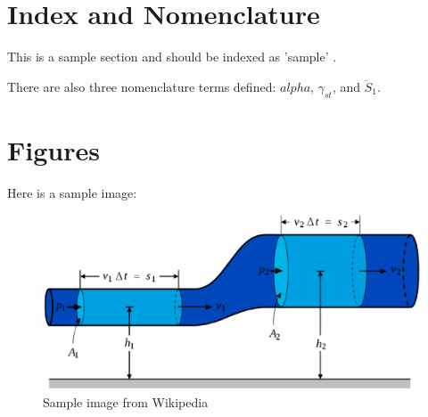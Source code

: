 \documentclass[12pt, letterpaper]{article}
\begin{document}


\printnomenclature	%
\tableofcontents
\listoffigures
\listoftables

\newpage


\section{Index and Nomenclature}
This is a sample section and should be indexed as 'sample'
\cite{sample01}.  

There are also three nomenclature terms defined: $alpha$, $\gamma_{st}$, and
$\ddot{S}_1$.



\newpage 
\section{Figures}

Here is a sample image:
\begin{figure}[!ht]	%
	\centering								%


	\includegraphics[scale=0.35]
		{figs/790px-BernoullisLawDerivationDiagram.eps}

	\caption{Sample image from Wikipedia}	%
	\label{fig:wiki01}						%
\end{figure}								%
\end{document}
